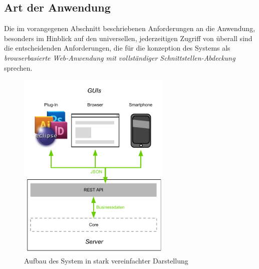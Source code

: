 \subsection{Art der Anwendung}\label{l:loesungsart}

Die im vorangegenen Abschnitt beschriebenen Anforderungen an die Anwendung, besonders im Hinblick auf den universellen, jederzeitigen Zugriff von überall sind die entscheidenden Anforderungen, die für die konzeption des Systems als \emph{browserbasierte Web-Anwendung mit vollständiger Schnittstellen-Abdeckung} sprechen. 

\bigskip

\begin{figure}[htb]
\begin{center}
\includegraphics[width=0.65\textwidth]{media/ArtdesSystems.pdf}
\caption{Aufbau des System in stark vereinfachter Darstellung}
\label{chart:aufbaudessystems}
\end{center}
\end{figure}


